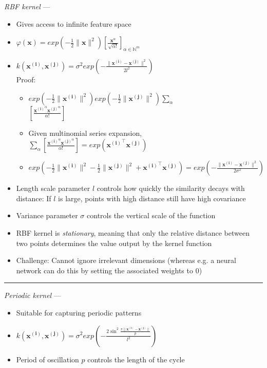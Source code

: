 \emph{RBF kernel} ---
\begin{itemize}
    \item Gives access to infinite feature space
    \item $\varphi(\boldsymbol{x}) = exp ( -\frac{1}{2} \|\boldsymbol{x}\|^2 ) [ \frac{ \boldsymbol{x}^\alpha }{ \sqrt{\alpha!} } ]_{\alpha \in \mathbb{N}^m}$ 
    \item $k( \boldsymbol{x^{(i)}}, \boldsymbol{x^{(j)}} ) = \sigma^2 exp (- \frac{ \| \boldsymbol{x^{(i)}} - \boldsymbol{x^{(j)}} \|^2 }{ 2l^2 } )$\\
    Proof:
    \begin{itemize}
        \item $exp ( -\frac{1}{2} \|\boldsymbol{x^{(i)}}\|^2 ) exp ( -\frac{1}{2} \|\boldsymbol{x^{(j)}}\|^2 ) \sum_\alpha$\\
        $[ \frac{ \boldsymbol{x^{(i)}}^\alpha \boldsymbol{x^{(j)}}^\alpha }{ \alpha! } ]$
        \item Given multinomial series expansion, $\sum_\alpha [ \frac{ \boldsymbol{x^{(i)}}^\alpha \boldsymbol{x^{(j)}}^\alpha }{ \alpha! } ] = exp(\boldsymbol{x^{(i)}}^\intercal \boldsymbol{x^{(j)}})$
        \item $exp ( -\frac{1}{2} \|\boldsymbol{x^{(i)}}\|^2  -\frac{1}{2} \|\boldsymbol{x^{(j)}}\|^2 + \boldsymbol{x^{(i)}}^\intercal \boldsymbol{x^{(j)}}) = exp (- \frac{ \| \boldsymbol{x^{(i)}} - \boldsymbol{x^{(j)}} \|^2 }{ 2\sigma^2 } )$
    \end{itemize}
    \item Length scale parameter $l$ controls how quickly the similarity decays with distance: If $l$ is large, points with high distance still have high covariance
    \item Variance parameter $\sigma$ controls the vertical scale of the function
    \item RBF kernel is \emph{stationary}, meaning that only the relative distance between two points determines the value output by the kernel function
    \item Challenge: Cannot ignore irrelevant dimensions (whereas e.g. a neural network can do this by setting the associated weights to $0$)
\end{itemize}

{\color{lightgray}\hrule height 0.001mm}

\emph{Periodic kernel} ---
\begin{itemize}
    \item Suitable for capturing periodic patterns
    \item $k( \boldsymbol{x^{(i)}}, \boldsymbol{x^{(j)}} ) = \sigma^2 exp (- \frac{ 2 \sin^2 \frac{ \pi \| \boldsymbol{x^{(i)}} - \boldsymbol{x^{(j)}} \|}{p} }{ l^2 } )$
    \item Period of oscillation $p$ controls the length of the cycle
\end{itemize}

